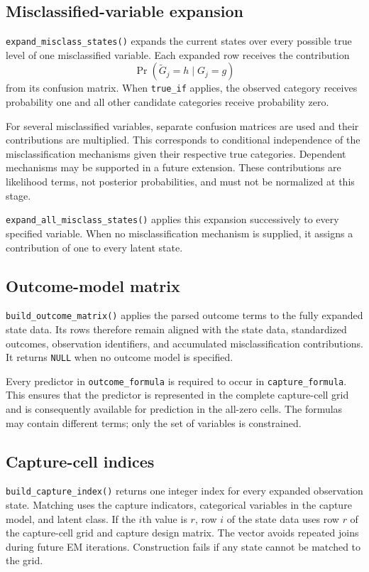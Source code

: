 \documentclass[11pt,letterpaper]{article}
\begin{document}
\subsection{Misclassified-variable expansion}

\texttt{expand\_misclass\_states()} expands the current states over every
possible true level of one misclassified variable. Each expanded row receives
the contribution
\[
  \Pr(\widetilde G_j=h\mid G_j=g)
\]
from its confusion matrix. When \texttt{true\_if} applies, the observed
category receives probability one and all other candidate categories receive
probability zero.

For several misclassified variables, separate confusion matrices are used and
their contributions are multiplied. This corresponds to conditional
independence of the misclassification mechanisms given their respective true
categories. Dependent mechanisms may be supported in a future extension.
These contributions are likelihood terms, not posterior probabilities, and
must not be normalized at this stage.

\texttt{expand\_all\_misclass\_states()} applies this expansion successively
to every specified variable. When no misclassification mechanism is supplied,
it assigns a contribution of one to every latent state.

\subsection{Outcome-model matrix}

\texttt{build\_outcome\_matrix()} applies the parsed outcome terms to the
fully expanded state data. Its rows therefore remain aligned with the state
data, standardized outcomes, observation identifiers, and accumulated
misclassification contributions. It returns \texttt{NULL} when no outcome
model is specified.

Every predictor in \texttt{outcome\_formula} is required to occur in
\texttt{capture\_formula}. This ensures that the predictor is represented in
the complete capture-cell grid and is consequently available for prediction
in the all-zero cells. The formulas may contain different terms; only the set
of variables is constrained.

\subsection{Capture-cell indices}

\texttt{build\_capture\_index()} returns one integer index for every expanded
observation state. Matching uses the capture indicators, categorical variables
in the capture model, and latent class. If the $i$th value is $r$, row $i$ of
the state data uses row $r$ of the capture-cell grid and capture design matrix.
The vector avoids repeated joins during future EM iterations. Construction
fails if any state cannot be matched to the grid.
\end{document}

